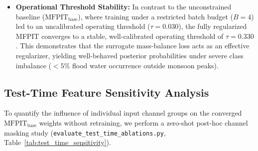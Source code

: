 \documentclass[preprint,12pt]{elsarticle}
\begin{document}
\begin{itemize}
    \item \textbf{Operational Threshold Stability:} In contrast to the unconstrained baseline ($\text{MFPIT}_{\text{base}}$), where training under a restricted batch budget ($B=4$) led to an uncalibrated operating threshold ($\tau = 0.030$), the fully regularized MFPIT converges to a stable, well-calibrated operating threshold of $\tau = 0.330$. This demonstrates that the surrogate mass-balance loss acts as an effective regularizer, yielding well-behaved posterior probabilities under severe class imbalance ($<5\%$ flood water occurrence outside monsoon peaks).
\end{itemize}

\subsection{Test-Time Feature Sensitivity Analysis}
To quantify the influence of individual input channel groups on the converged $\text{MFPIT}_{\text{base}}$ weights without retraining, we perform a zero-shot post-hoc channel masking study (\texttt{evaluate\_test\_time\_ablations.py}, Table~\ref{tab:test_time_sensitivity}).

\begin{table}[htbp]
\caption{Zero-Shot Test-Time Channel Masking Results on $\text{MFPIT}_{\text{base}}$ (\texttt{test\_time\_ablation\_metrics.json})}
\label{tab:test_time_sensitivity}
\centering
{}
\end{table}
\end{document}
